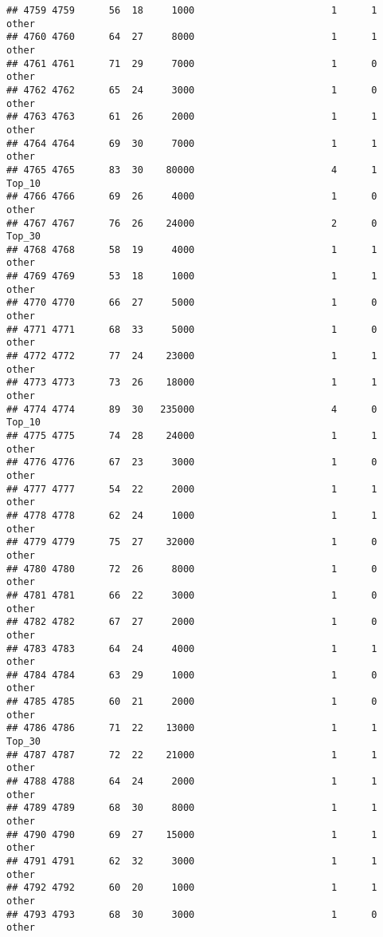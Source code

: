 \documentclass[
]{article}
\begin{document}
\begin{verbatim}
## 4759 4759      56  18     1000                        1      1    other
## 4760 4760      64  27     8000                        1      1    other
## 4761 4761      71  29     7000                        1      0    other
## 4762 4762      65  24     3000                        1      0    other
## 4763 4763      61  26     2000                        1      1    other
## 4764 4764      69  30     7000                        1      1    other
## 4765 4765      83  30    80000                        4      1   Top_10
## 4766 4766      69  26     4000                        1      0    other
## 4767 4767      76  26    24000                        2      0   Top_30
## 4768 4768      58  19     4000                        1      1    other
## 4769 4769      53  18     1000                        1      1    other
## 4770 4770      66  27     5000                        1      0    other
## 4771 4771      68  33     5000                        1      0    other
## 4772 4772      77  24    23000                        1      1    other
## 4773 4773      73  26    18000                        1      1    other
## 4774 4774      89  30   235000                        4      0   Top_10
## 4775 4775      74  28    24000                        1      1    other
## 4776 4776      67  23     3000                        1      0    other
## 4777 4777      54  22     2000                        1      1    other
## 4778 4778      62  24     1000                        1      1    other
## 4779 4779      75  27    32000                        1      0    other
## 4780 4780      72  26     8000                        1      0    other
## 4781 4781      66  22     3000                        1      0    other
## 4782 4782      67  27     2000                        1      0    other
## 4783 4783      64  24     4000                        1      1    other
## 4784 4784      63  29     1000                        1      0    other
## 4785 4785      60  21     2000                        1      0    other
## 4786 4786      71  22    13000                        1      1   Top_30
## 4787 4787      72  22    21000                        1      1    other
## 4788 4788      64  24     2000                        1      1    other
## 4789 4789      68  30     8000                        1      1    other
## 4790 4790      69  27    15000                        1      1    other
## 4791 4791      62  32     3000                        1      1    other
## 4792 4792      60  20     1000                        1      1    other
## 4793 4793      68  30     3000                        1      0    other

\end{verbatim}
\end{document}
